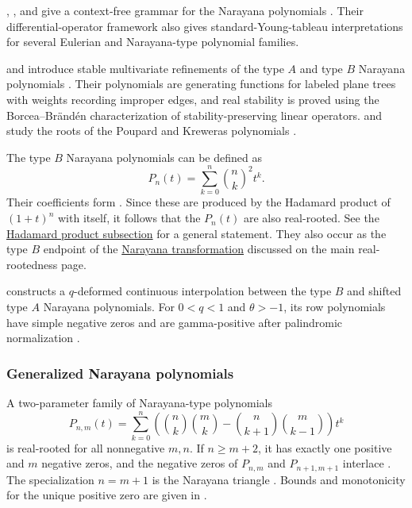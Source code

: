 \begin{example*}
, , and  give a
context-free grammar for the Narayana polynomials \cite{MaYehYeh2023x}.
Their differential-operator framework also gives standard-Young-tableau
interpretations for several Eulerian and Narayana-type polynomial families.

 and  introduce stable
multivariate refinements of the type $A$ and type $B$ Narayana polynomials
\cite{YangZhang2024x}.  Their polynomials are generating functions for
labeled plane trees with weights recording improper edges, and real stability
is proved using the Borcea--Brändén characterization of stability-preserving
linear operators.
 and  study the roots of the
Poupard and Kreweras polynomials \cite{ChapotonHan2020}.
\end{example*}


\begin{example*}
The type $B$ Narayana polynomials can be defined as
\[
P_n(t) = \sum_{k=0}^n \binom{n}{k}^2 t^k.
\]
Their coefficients form .
Since these are produced by the Hadamard product of $(1+t)^n$ with itself, it
follows that the $P_n(t)$ are also real-rooted.
See the \hyperref[hadamardProduct]{Hadamard product subsection} for a general statement.
They also occur as the type $B$ endpoint of the
\hyperref[narayanaTransformations]{Narayana transformation} discussed on the
main real-rootedness page.
\end{example*}

 constructs a $q$-deformed continuous interpolation
between the type $B$ and shifted type $A$ Narayana polynomials.  For
$0<q<1$ and $\theta>-1$, its row polynomials have simple negative zeros and
are gamma-positive after palindromic normalization
\cite[Thm.~9.2 and Cor.~9.4]{Zeng2026qNarayana}.



\subsubsection[generalizedNarayanaPolynomialsRealRooted]{Generalized Narayana polynomials}

\begin{example*}
A two-parameter family of Narayana-type polynomials
\[
P_{n,m}(t) = \sum_{k=0}^n
\left(\binom{n}{k}\binom{m}{k}
-\binom{n}{k+1}\binom{m}{k-1} \right)t^k
\]
is real-rooted for all nonnegative $m,n$.  If $n\geq m+2$, it has exactly
one positive and $m$ negative zeros, and the negative zeros of $P_{n,m}$
and $P_{n+1,m+1}$ interlace \cite[Thm.~3.4]{ChenYangZhang2018}.
The specialization $n=m+1$ is the Narayana triangle .
Bounds and monotonicity for the unique positive zero are given in
\cite[Thms.~3.1 and~4.1]{Zhao2021x}.
\end{example*}


